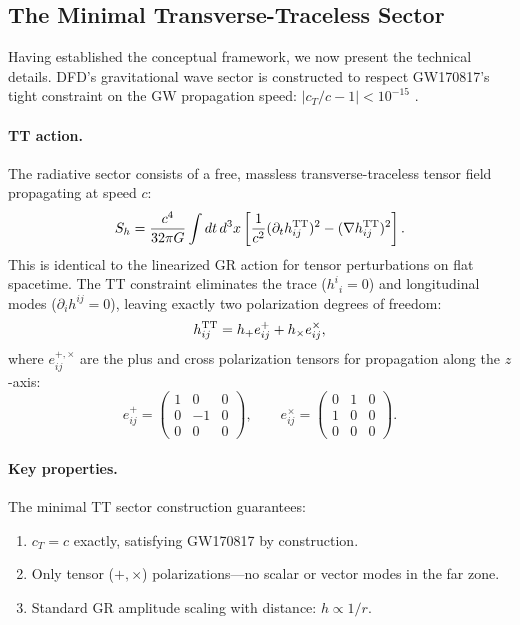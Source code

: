 \subsection{The Minimal Transverse-Traceless Sector}\label{sec:gw-tt}

Having established the conceptual framework, we now present the technical details. DFD's gravitational wave sector is constructed to respect GW170817's tight constraint on the GW propagation speed: $|c_T/c - 1| < 10^{-15}$ \cite{Abbott2017GW}.

\paragraph{TT action.}
The radiative sector consists of a free, massless transverse-traceless tensor field propagating at speed $c$:
\begin{equation}\label{eq:gw-action}
S_h = \frac{c^4}{32\pi G}\int dt\, d^3x \left[\frac{1}{c^2}(\partial_t h_{ij}^{\rm TT})^2 - (\nabla h_{ij}^{\rm TT})^2\right].
\end{equation}
This is identical to the linearized GR action for tensor perturbations on flat spacetime. The TT constraint eliminates the trace ($h^i{}_i = 0$) and longitudinal modes ($\partial_i h^{ij} = 0$), leaving exactly two polarization degrees of freedom:
\begin{equation}\label{eq:gw-polarizations}
h_{ij}^{\rm TT} = h_+ e_{ij}^{+} + h_{\times} e_{ij}^{\times},
\end{equation}
where $e_{ij}^{+,\times}$ are the plus and cross polarization tensors for propagation along the $z$-axis:
\begin{equation}
e_{ij}^{+} = \begin{pmatrix} 1 & 0 & 0 \\ 0 & -1 & 0 \\ 0 & 0 & 0 \end{pmatrix}, \qquad
e_{ij}^{\times} = \begin{pmatrix} 0 & 1 & 0 \\ 1 & 0 & 0 \\ 0 & 0 & 0 \end{pmatrix}.
\end{equation}

\paragraph{Key properties.}
The minimal TT sector construction guarantees:
\begin{enumerate}
\item $c_T = c$ exactly, satisfying GW170817 by construction.
\item Only tensor ($+, \times$) polarizations---no scalar or vector modes in the far zone.
\item Standard GR amplitude scaling with distance: $h \propto 1/r$.
\end{enumerate}

